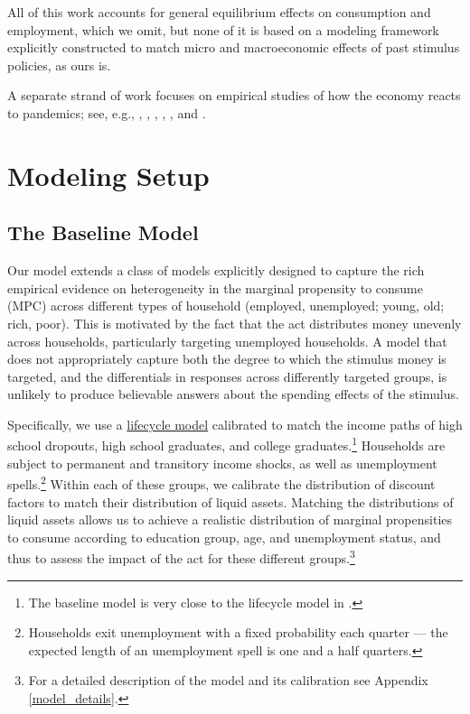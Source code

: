 \documentclass[titlepage,letterpaper]{\econtex}
\begin{document}
All of this work accounts for general equilibrium effects on consumption and employment, which we omit, but none of it is based on a modeling framework explicitly constructed to match micro and macroeconomic effects of past stimulus policies, as ours is.

A separate strand of work focuses on empirical studies of how the economy reacts to pandemics; see, e.g., \cite{baker_Cpandemic}, \cite{jorda_pandemics}, \cite{verner_pandemics}, \cite{chetty_covidC}, \cite{garner_receipt}, \cite{casado_stimulus} and \cite{coibion_stimulus}.

\hypertarget{Modeling-Setup}{}

\section{Modeling Setup}

\subsection{The Baseline Model}

Our model extends a class of models explicitly designed to capture the rich empirical evidence on heterogeneity in the marginal propensity to consume (MPC) across different types of household (employed, unemployed; young, old; rich, poor).
This is motivated by the fact that the act distributes money unevenly across households, particularly targeting unemployed households.
A model that does not appropriately capture both the degree to which the stimulus money is targeted, and the differentials in responses across differently targeted groups, is unlikely to produce believable answers about the spending effects of the stimulus.

Specifically, we use a \href{https://pubs.aeaweb.org/doi/pdfplus/10.1257/jep.15.3.3}{lifecycle model} calibrated to match the income paths of high school dropouts, high school graduates, and college graduates.\footnote{The baseline model is very close to the lifecycle model in \cite{cstwMPC}.}
Households are subject to permanent and transitory income shocks, as well as unemployment spells.\footnote{Households exit unemployment with a fixed probability each quarter --- the expected length of an unemployment spell is one and a half quarters.}
Within each of these groups, we calibrate the distribution of discount factors to match their distribution of liquid assets.
Matching the distributions of liquid assets allows us to achieve a realistic distribution of marginal propensities to consume according to education group, age, and unemployment status, and thus to assess the impact of the act for these different groups.\footnote{For a detailed description of the model and its calibration see Appendix \ref{model_details}.}
\end{document}
